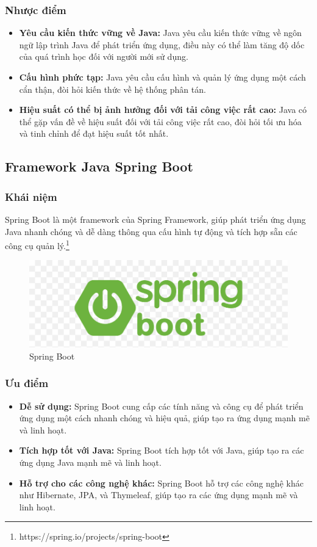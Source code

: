 \subsubsection{Nhược điểm}
\begin{itemize}
  \item \textbf{Yêu cầu kiến thức vững về Java:} Java yêu cầu kiến thức vững về ngôn ngữ lập trình Java để phát triển ứng dụng, điều này có thể làm tăng độ dốc của quá trình học đối với người mới sử dụng.
  \item \textbf{Cấu hình phức tạp:} Java yêu cầu cấu hình và quản lý ứng dụng một cách cẩn thận, đòi hỏi kiến thức về hệ thống phân tán.
  \item \textbf{Hiệu suất có thể bị ảnh hưởng đối với tải công việc rất cao:} Java có thể gặp vấn đề về hiệu suất đối với tải công việc rất cao, đòi hỏi tối ưu hóa và tinh chỉnh để đạt hiệu suất tốt nhất.
\end{itemize}
\subsection{Framework Java Spring Boot}
\subsubsection{Khái niệm}
\noindent Spring Boot là một framework của Spring Framework, giúp phát triển ứng dụng Java nhanh chóng và dễ dàng thông qua cấu hình tự động và tích hợp sẵn các công cụ quản lý.\footnote{https://spring.io/projects/spring-boot}
\begin{figure}[H]
  \begin{center}
    \includegraphics[scale=0.3]{images/hieu/phuluc/spring-boot.png}
    \caption{Spring Boot}
  \end{center}
\end{figure}
\subsubsection{Ưu điểm}
\begin{itemize}
  \item \textbf{Dễ sử dụng:} Spring Boot cung cấp các tính năng và công cụ để phát triển ứng dụng một cách nhanh chóng và hiệu quả, giúp tạo ra ứng dụng mạnh mẽ và linh hoạt.
  \item \textbf{Tích hợp tốt với Java:} Spring Boot tích hợp tốt với Java, giúp tạo ra các ứng dụng Java mạnh mẽ và linh hoạt.
  \item \textbf{Hỗ trợ cho các công nghệ khác:} Spring Boot hỗ trợ các công nghệ khác như Hibernate, JPA, và Thymeleaf, giúp tạo ra các ứng dụng mạnh mẽ và linh hoạt.
\end{itemize}
